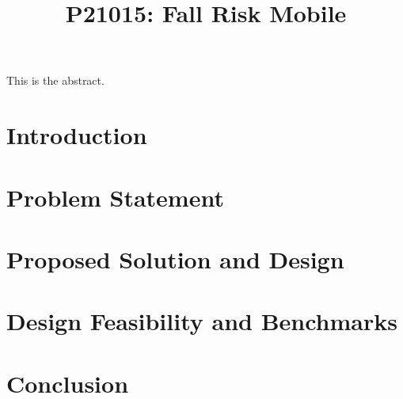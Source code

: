 \documentclass[10pt, conference]{IEEEtran}
\title{P21015: Fall Risk Mobile}
\author{\IEEEauthorblockN{Matt Krol}
\IEEEauthorblockA{mrk7339@rit.edu}
\and
\IEEEauthorblockN{Jacob DeFord}
\IEEEauthorblockA{jwd5062@rit.edu}
\and
\IEEEauthorblockN{Paul Kelly}
\IEEEauthorblockA{pjk2563@rit.edu}
\and
\IEEEauthorblockN{Doyle Bartholet}
\IEEEauthorblockA{cdb3120@rit.edu}}
\begin{document}
\maketitle

\abstract

This is the abstract.

\section{Introduction}

\section{Problem Statement}

\section{Proposed Solution and Design}

\section{Design Feasibility and Benchmarks}

\section{Conclusion}

\nocite{*}


\end{document}
